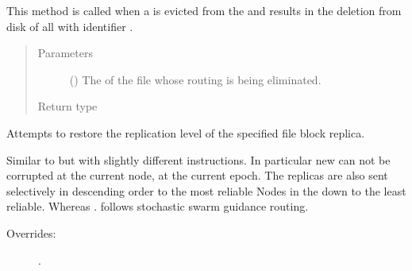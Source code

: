 \documentclass[letterpaper,10pt,english]{sphinxmanual}
\begin{document}
\begin{fulllineitems}
\begin{fulllineitems}
This method is called when a  is evicted from the
{\hyperref[\detokenize{app.domain:app.domain.cluster_groups.SGCluster}]{}} and
results in the deletion from disk of all {\hyperref[\detokenize{app.domain.helpers:app.domain.helpers.smart_dataclasses.FileBlockData}]{}} with
identifier .
\begin{quote}\begin{description}
\item[{Parameters}] \leavevmode
{} () \textendash{} The {\hyperref[\detokenize{app.domain.helpers:app.domain.helpers.smart_dataclasses.FileData.name}]{}}
of the file whose routing is being eliminated.

\item[{Return type}] \leavevmode
{}

\end{description}\end{quote}

\end{fulllineitems}


\begin{fulllineitems}
\label{\detokenize{app.domain:app.domain.network_nodes.SGNode.replicate_part}}
Attempts to restore the replication level of the specified file
block replica.

Similar to {\hyperref[\detokenize{app.domain:app.domain.network_nodes.Node.send_part}]{}} but with
slightly different instructions. In particular new 
can not be corrupted at the current node, at the current epoch. The
replicas are also sent selectively in descending order to the
most reliable Nodes in the  down to the least
reliable. Whereas . follows
stochastic swarm guidance routing.
\begin{description}
\item[{Overrides:}] \leavevmode
{\hyperref[\detokenize{app.domain:app.domain.network_nodes.Node.replicate_part}]{}}.


\end{description}
\end{fulllineitems}
\end{fulllineitems}
\end{document}

